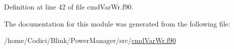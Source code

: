 Definition at line 42 of file cmd\-Var\-Wr.\-f90.



The documentation for this module was generated from the following file\-:\begin{DoxyCompactItemize}
\item 
/home/\-Codici/\-Blink/\-Power\-Manager/src/\hyperlink{cmd_var_wr_8f90}{cmd\-Var\-Wr.\-f90}\end{DoxyCompactItemize}
